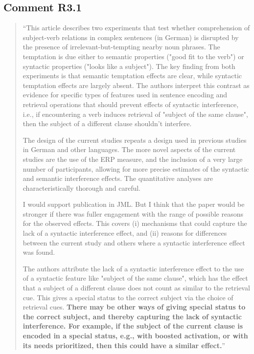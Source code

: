 \documentclass[12pt]{article}
\begin{document}
\subsection*{Comment R3.1}
\begin{quote}
``This article describes two experiments that test whether comprehension of subject-verb relations in complex sentences (in German) is disrupted by the presence of irrelevant-but-tempting nearby noun phrases. The temptation is due either to semantic properties ("good fit to the verb") or syntactic properties ("looks like a subject"). The key finding from both experiments is that semantic temptation effects are clear, while syntactic temptation effects are largely absent. The authors interpret this contrast as evidence for specific types of features used in sentence encoding and retrieval operations that should prevent effects of syntactic interference, i.e., if encountering a verb induces retrieval of "subject of the same clause", then the subject of a different clause shouldn't interfere.

The design of the current studies repeats a design used in previous studies in German and other languages. The more novel aspects of the current studies are the use of the ERP measure, and the inclusion of a very large number of participants, allowing for more precise estimates of the syntactic and semantic interference effects. The quantitative analyses are characteristically thorough and careful.

I would support publication in JML. But I think that the paper would be stronger if there was fuller engagement with the range of possible reasons for the observed effects. This covers (i) mechanisms that could capture the lack of a syntactic interference effect, and (ii) reasons for differences between the current study and others where a syntactic interference effect was found.

The authors attribute the lack of a syntactic interference effect to the use of a syntactic feature like "subject of the same clause", which has the effect that a subject of a different clause does not count as similar to the retrieval cue. This gives a special status to the correct subject via the choice of retrieval cues. \textbf{There may be other ways of giving special status to the correct subject, and thereby capturing the lack of syntactic interference. For example, if the subject of the current clause is encoded in a special status, e.g., with boosted activation, or with its needs prioritized, then this could have a similar effect.}''
\end{quote}
\end{document}
